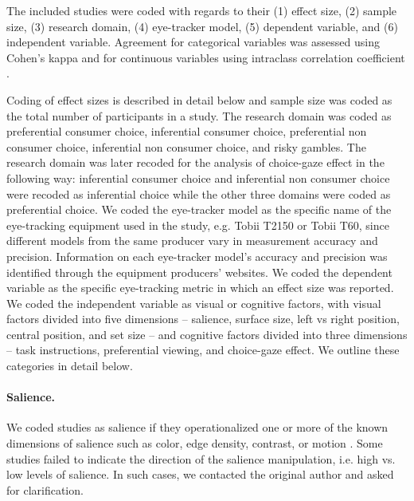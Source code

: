 The included studies were coded with regards to their (1) effect size, (2) sample size, (3) research domain, (4) eye-tracker model, (5) dependent variable, and (6) independent variable.  Agreement for categorical variables was assessed using Cohen's kappa and for continuous variables using intraclass correlation coefficient \citep{shrout1979a}. 

Coding of effect sizes is described in detail below and sample size was coded as the total number of participants in a study. The research domain was coded as preferential consumer choice, inferential consumer choice, preferential non consumer choice, inferential non consumer choice, and risky gambles. The research domain was later recoded for the analysis of choice-gaze effect in the following way: inferential consumer choice and inferential non consumer choice were recoded as inferential choice while the other three domains were coded as preferential choice. We coded the eye-tracker model as the specific name of the eye-tracking equipment used in the study, e.g. Tobii T2150 or Tobii T60, since different models from the same producer vary in measurement accuracy and precision. Information on each eye-tracker model's accuracy and precision was identified through the equipment producers' websites. We coded the dependent variable as the specific eye-tracking metric in which an effect size was reported. We coded the independent variable as visual or cognitive factors, with visual factors divided into five dimensions -- salience, surface size, left vs right position, central position, and set size -- and cognitive factors divided into three dimensions -- task instructions, preferential viewing, and choice-gaze effect. We outline these categories in detail below. 

\paragraph{Salience.} We coded studies as salience if they operationalized one or more of the known dimensions of salience such as color, edge density, contrast, or motion \citep{itti2000}. Some studies failed to indicate the direction of the salience manipulation, i.e. high vs. low levels of salience. In such cases, we contacted the original author and asked for clarification. 

